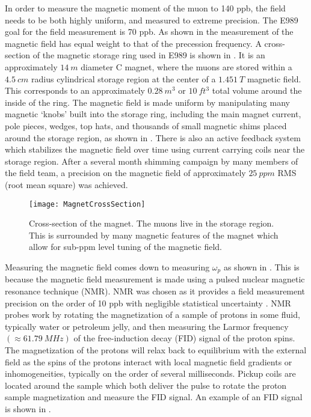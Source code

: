 In order to measure the magnetic moment of the muon to 140 ppb, the field needs to be both highly uniform, and measured to extreme precision. The E989 goal for the field measurement is 70 ppb. As shown in  the measurement of the magnetic field has equal weight to that of the precession frequency. A cross-section of the magnetic storage ring used in E989 is shown in . It is an approximately $\SI{14}{m}$ diameter C magnet, where the muons are stored within a $\SI{4.5}{cm}$ radius cylindrical storage region at the center of a $\SI{1.451}{T}$ magnetic field. This corresponds to an approximately $\SI{0.28}{m^{3}}$ or $\SI{10}{ft^{3}}$ total volume around the inside of the ring. The magnetic field is made uniform by manipulating many magnetic `knobs' built into the \gmtwo storage ring, including the main magnet current, pole pieces, wedges, top hats, and thousands of small magnetic shims placed around the storage region, as shown in . There is also an active feedback system which stabilizes the magnetic field over time using current carrying coils near the storage region. After a several month shimming campaign by many members of the field team, a precision on the magnetic field of approximately $\SI{25}{ppm}$ RMS (root mean square) was achieved.

\begin{figure}[]
    \centering
    \texttt{[image: MagnetCrossSection]}
    \caption[Magnet cross section]{Cross-section of the \gmtwo magnet. The muons live in the storage region. This is surrounded by many magnetic features of the magnet which allow for sub-ppm level tuning of the magnetic field.}
    \label{fig:MagnetCrossSection}
\end{figure}


Measuring the magnetic field comes down to measuring $\omega_{p}$ as shown in . This is because the magnetic field measurement is made using a pulsed nuclear magnetic resonance technique (NMR). NMR was chosen as it provides a field measurement precision on the order of 10 ppb with negligible statistical uncertainty \cite{TDR}. NMR probes work by rotating the magnetization of a sample of protons in some fluid, typically water or petroleum jelly, and then measuring the Larmor frequency $(\approx \SI{61.79}{MHz})$ of the free-induction decay (FID) signal of the proton spins. The magnetization of the protons will relax back to equilibrium with the external field as the spins of the protons interact with local magnetic field gradients or inhomogeneities, typically on the order of several milliseconds. Pickup coils are located around the sample which both deliver the pulse to rotate the proton sample magnetization and measure the FID signal. An example of an FID signal is shown in .

